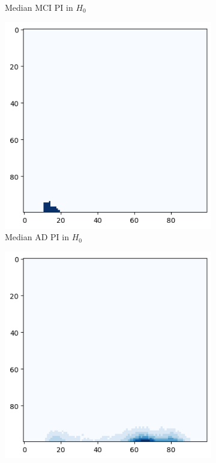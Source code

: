 \documentclass{article}
\begin{document}
\begin{figure}[htb]
\begin{subfigure}{0.32\textwidth}
    \caption{Median MCI PI in $H_0$}
  \end{subfigure}
  \begin{subfigure}{0.32\textwidth}
    \includegraphics[width=\textwidth]{figures/median_pis/median_pi_AD_h_0_rep.png}
    \caption{Median AD PI in $H_0$}
  \end{subfigure}
  \begin{subfigure}{0.32\textwidth}
    \includegraphics[width=\textwidth]{figures/median_pis/median_pi_CN_h_1_rep.png}

\end{subfigure}
\end{figure}
\end{document}
